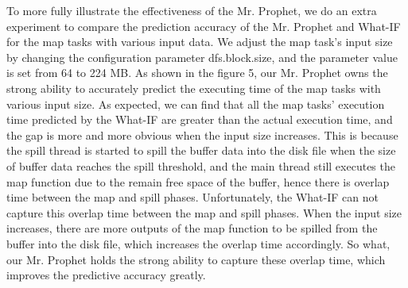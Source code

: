 To more fully illustrate the effectiveness of the Mr. Prophet, we do an extra experiment to compare the prediction accuracy of the Mr. Prophet and What-IF for the map tasks with various input data. We adjust the map task's input size by changing the configuration parameter dfs.block.size, and the parameter value is set from 64 to 224 MB. As shown in the figure 5, our Mr. Prophet owns the strong ability to accurately predict the executing time of the map tasks with various input size. As expected, we can find that all the map tasks' execution time predicted by the What-IF are greater than the actual execution time, and the gap is more and more obvious when the input size increases. This is because the spill thread is started to spill the buffer data into the disk file when the size of buffer data reaches the spill threshold, and the main thread still executes the map function due to the remain free space of the buffer, hence there is overlap time between the map and spill phases. Unfortunately, the What-IF can not capture this overlap time between the map and spill phases. When the input size increases, there are more outputs of the map function to be spilled from the buffer into the disk file, which increases the overlap time accordingly. So what, our Mr. Prophet holds the strong ability to capture these overlap time, which improves the predictive accuracy greatly.
